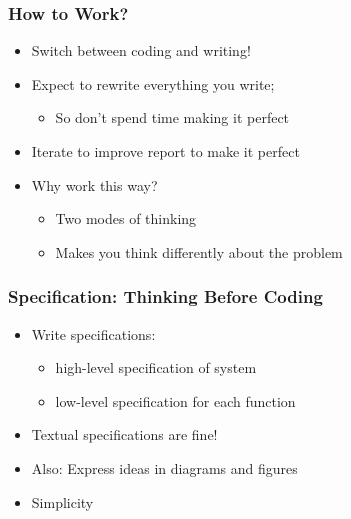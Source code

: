 \documentclass[hyperref={pdfpagelabels=false,linkcolor=blue}, aspectratio=1610]{beamer}
\begin{document}
\begin{frame}
\frametitle{How to Work?}
\begin{block}{}
 \begin{itemize}
  \item<2-> Switch between coding and writing!
  \item<2-> Expect to rewrite everything you write; 
  \begin{itemize}
  	\item<2-> So don't spend time making it perfect 
  \end{itemize}
  \item<2-> Iterate to improve report to make it perfect
  \item<2-> Why work this way?
  \begin{itemize}
	\item<2-> Two modes of thinking
  	\item<2-> Makes you think differently about the problem 
  \end{itemize}
 \end{itemize}
\end{block}
\end{frame}

\begin{frame}
\frametitle{Specification: Thinking Before Coding}
\begin{block}{}
 \begin{itemize}
  \item Write specifications:
  \begin{itemize}
  	\item high-level specification of system
	\item low-level specification for each function
  \end{itemize}
  \item Textual specifications are fine!
  \item Also: Express ideas in diagrams and figures
  \item Simplicity
 \end{itemize}
\end{block}
\end{frame}
\end{document}
